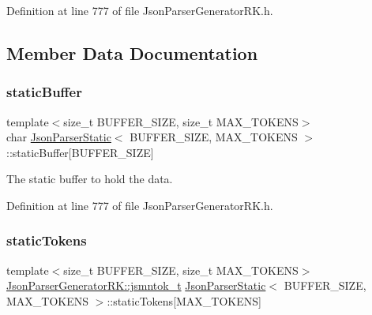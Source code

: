 Definition at line 777 of file Json\+Parser\+Generator\+R\+K.\+h.



\subsection{Member Data Documentation}
\mbox{\label{class_json_parser_static_a7098ca786f3e7ecacbe2824e49c4fc23}} 
\subsubsection{\texorpdfstring{static\+Buffer}{staticBuffer}}
{\footnotesize\ttfamily template$<$size\+\_\+t B\+U\+F\+F\+E\+R\+\_\+\+S\+I\+ZE, size\+\_\+t M\+A\+X\+\_\+\+T\+O\+K\+E\+NS$>$ \\
char \hyperlink{class_json_parser_static}{Json\+Parser\+Static}$<$ B\+U\+F\+F\+E\+R\+\_\+\+S\+I\+ZE, M\+A\+X\+\_\+\+T\+O\+K\+E\+NS $>$\+::static\+Buffer\mbox{[}B\+U\+F\+F\+E\+R\+\_\+\+S\+I\+ZE\mbox{]}\hspace{0.3cm}{\ttfamily [private]}}



The static buffer to hold the data. 



Definition at line 777 of file Json\+Parser\+Generator\+R\+K.\+h.

\mbox{\label{class_json_parser_static_a46bd3b4c6e0d3205dfdcb6ef1e5dab8c}} 
\subsubsection{\texorpdfstring{static\+Tokens}{staticTokens}}
{\footnotesize\ttfamily template$<$size\+\_\+t B\+U\+F\+F\+E\+R\+\_\+\+S\+I\+ZE, size\+\_\+t M\+A\+X\+\_\+\+T\+O\+K\+E\+NS$>$ \\
\hyperlink{struct_json_parser_generator_r_k_1_1jsmntok__t}{Json\+Parser\+Generator\+R\+K\+::jsmntok\+\_\+t} \hyperlink{class_json_parser_static}{Json\+Parser\+Static}$<$ B\+U\+F\+F\+E\+R\+\_\+\+S\+I\+ZE, M\+A\+X\+\_\+\+T\+O\+K\+E\+NS $>$\+::static\+Tokens\mbox{[}M\+A\+X\+\_\+\+T\+O\+K\+E\+NS\mbox{]}\hspace{0.3cm}{\ttfamily [private]}}



